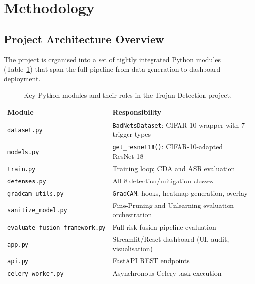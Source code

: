\documentclass[12pt, letterpaper]{article}
\begin{document}
\FloatBarrier


\section{Methodology}
\label{sec:methodology}

\subsection{Project Architecture Overview}

The project is organised into a set of tightly integrated Python modules
(Table~\ref{tab:modules}) that span the full pipeline from data generation to
dashboard deployment.

\begin{table}[!htbp]
  \centering
  \caption{Key Python modules and their roles in the Trojan Detection project.}
  \label{tab:modules}
  \small
  \begin{tabularx}{\linewidth}{@{} l X @{}}
    \toprule
    \textbf{Module}              & \textbf{Responsibility} \\
    \midrule
    \texttt{dataset.py}          & \texttt{BadNetsDataset}: CIFAR-10 wrapper with 7 trigger types \\
    \texttt{models.py}           & \texttt{get\_resnet18()}: CIFAR-10-adapted ResNet-18 \\
    \texttt{train.py}            & Training loop; CDA and ASR evaluation \\
    \texttt{defenses.py}         & All 8 detection/mitigation classes \\
    \texttt{gradcam\_utils.py}   & \texttt{GradCAM}: hooks, heatmap generation, overlay \\
    \texttt{sanitize\_model.py}  & Fine-Pruning and Unlearning evaluation orchestration \\
    \texttt{evaluate\_fusion\_framework.py} & Full risk-fusion pipeline evaluation \\
    \texttt{app.py}              & Streamlit/React dashboard (UI, audit, visualisation) \\
    \texttt{api.py}              & FastAPI REST endpoints \\
    \texttt{celery\_worker.py}   & Asynchronous Celery task execution \\
    \bottomrule
  \end{tabularx}
\end{table}
\end{document}
